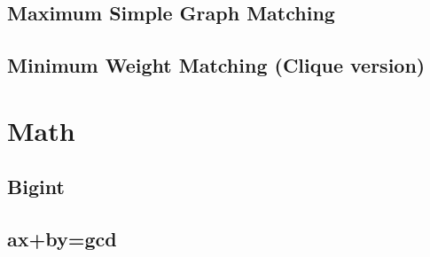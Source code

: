 \documentclass[a4paper,10pt,twocolumn,oneside]{article}
\begin{document}
\subsection{Maximum Simple Graph Matching}


\subsection{Minimum Weight Matching (Clique version)}


%


%

%

%

\section{Math}

\subsection{Bigint}


\subsection{ax+by=gcd}

\end{document}
